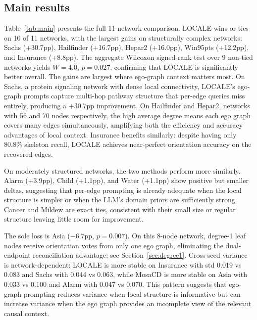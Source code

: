 \documentclass{article} %
\begin{document}
\subsection{Main results}

Table~\ref{tab:main} presents the full 11-network comparison. LOCALE wins or ties on 10 of 11 networks, with the largest gains on structurally complex networks: Sachs (+30.7pp), Hailfinder (+16.7pp), Hepar2 (+16.0pp), Win95pts (+12.2pp), and Insurance (+8.8pp). The aggregate Wilcoxon signed-rank test over 9 non-tied networks yields $W{=}4.0$, $p{=}0.027$, confirming that LOCALE is significantly better overall.
The gains are largest where ego-graph context matters most. On Sachs, a protein signaling network with dense local connectivity, LOCALE's ego-graph prompts capture multi-hop pathway structure that per-edge queries miss entirely, producing a +30.7pp improvement. On Hailfinder and Hepar2, networks with 56 and 70 nodes respectively, the high average degree means each ego graph covers many edges simultaneously, amplifying both the efficiency and accuracy advantages of local context. Insurance benefits similarly: despite having only 80.8\% skeleton recall, LOCALE achieves near-perfect orientation accuracy on the recovered edges.

On moderately structured networks, the two methods perform more similarly. Alarm (+3.9pp), Child (+1.1pp), and Water (+1.1pp) show positive but smaller deltas, suggesting that per-edge prompting is already adequate when the local structure is simpler or when the LLM's domain priors are sufficiently strong. Cancer and Mildew are exact ties, consistent with their small size or regular structure leaving little room for improvement.

The sole loss is Asia ($-$6.7pp, $p{=}0.007$). On this 8-node network, degree-1 leaf nodes receive orientation votes from only one ego graph, eliminating the dual-endpoint reconciliation advantage; see Section~\ref{sec:degree1}. Cross-seed variance is network-dependent: LOCALE is more stable on Insurance with std 0.019 vs 0.083 and Sachs with 0.044 vs 0.063, while MosaCD is more stable on Asia with 0.033 vs 0.100 and Alarm with 0.047 vs 0.070. This pattern suggests that ego-graph prompting reduces variance when local structure is informative but can increase variance when the ego graph provides an incomplete view of the relevant causal context.
\end{document}
